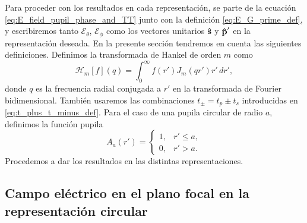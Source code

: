 Para proceder con los resultados en cada representación, se parte de la ecuación \eqref{eq:E_field_pupil_phase_and_TT} junto con la definición \eqref{eq:E_G_prime_def}, y escribiremos tanto $\mathscr E_\theta$, $\mathscr E_\phi$ como los vectores unitarios $\bm{\hat{\mathbf{s}}}$  y $\bm{\hat{\mathbf{p}}}'$ en la representación deseada. En la presente sección tendremos en cuenta las siguientes definiciones. Definimos la transformada de Hankel de orden $m$ como
\begin{equation}
\mathscr H_m[f](q)
=
\int_0^\infty
f(r')J_m(qr')r'\,dr',
\label{eq:def_Hankel_Transform_m_order}
\end{equation}
donde $q$ es la frecuencia radial conjugada a $r'$ en la transformada de Fourier bidimensional. También usaremos las combinaciones $t_\pm = t_p \pm t_s$ introducidas en
\eqref{eq:t_plus_t_minus_def}. Para el caso de una pupila circular de radio $a$, definimos la función pupila
\begin{equation}
A_a(r')
=
\begin{cases}
1, & r' \leq a, \\
0, & r' > a.
\end{cases}
\label{eq:def_pupil_function}
\end{equation}
Procedemos a dar los resultados en las distintas representaciones.


\subsection{Campo eléctrico en el plano focal en la representación circular}


